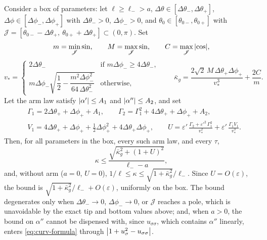 Consider a box of parameters: let \(\ell\ge\ell_->a\), \(\Delta\theta\in[\Delta\theta_-,\Delta\theta_+]\), \(\Delta\phi\in[\Delta\phi_-,\Delta\phi_+]\) with \(\Delta\theta_->0\), \(\Delta\phi_->0\), and \(\theta_0\in[\theta_{0-},\theta_{0+}]\) with \(\mathscr J = [\theta_{0-}-\Delta\theta_+,\ \theta_{0+}+\Delta\theta_+]\subset(0,\pi)\).
Set
\begin{equation}
    m = \min_{\mathscr J}\sin, \qquad M = \max_{\mathscr J}\sin, \qquad C = \max_{\mathscr J}\abs{\cos},
\end{equation}
\begin{equation}
    v_* = \begin{cases}
        2\Delta\theta_- & \text{if } m\Delta\phi_-\ge4\Delta\theta_-, \\[2pt]
        m\Delta\phi_-\sqrt{\dfrac12 - \dfrac{m^2\Delta\phi_-^2}{64\,\Delta\theta_-^2}} & \text{otherwise,}
    \end{cases}
    \qquad
    \bar\kappa_g = \frac{2\sqrt2\,M\,\Delta\theta_+\Delta\phi_+}{v_*^3} + \frac{2C}{m}.
\end{equation}
Let the arm law satisfy \(\abs{\alpha'}\le A_1\) and \(\abs{\alpha''}\le A_2\), and set
\begin{equation}
\begin{split}
    &\Gamma_1 = 2\Delta\theta_+ + \Delta\phi_+ + A_1, \qquad \Gamma_2 = \Gamma_1^2 + 4\Delta\theta_+ + \Delta\phi_+ + A_2, \\
    &V_1 = 4\Delta\theta_+ + \Delta\phi_+ + \tfrac12\Delta\phi_+^2 + 4\Delta\theta_+\Delta\phi_+, \qquad
    U = \varepsilon'\,\frac{\Gamma_2 + \varepsilon'^2\,\Gamma_1^2}{v_*^2} + \varepsilon'\,\frac{\Gamma_1V_1}{v_*^3}.
\end{split}
\end{equation}
Then, for all parameters in the box, every such arm law, and every \(\tau\),
\begin{equation} \label{eq:curv-bound}
    \kappa \le \frac{\sqrt{\bar\kappa_g^2 + (1+U)^2}}{\ell_--a},
\end{equation}
and, without arm (\(a=0\), \(U=0\)), \(1/\ell\le\kappa\le\sqrt{1+\bar\kappa_g^2}/\ell_-\).
Since \(U = O(\varepsilon)\), the bound is \(\sqrt{1+\bar\kappa_g^2}/\ell_- + O(\varepsilon)\), uniformly on the box.
The bound degenerates only when \(\Delta\theta_-\to0\), \(\Delta\phi_-\to0\), or \(\mathscr J\) reaches a pole, which is unavoidable by the exact tip and bottom values above; and, when \(a>0\), the bound on \(\alpha''\) cannot be dispensed with, since \(u_{\sigma\sigma}\), which contains \(\alpha''\) linearly, enters \eqref{eq:curv-formula} through \(\abs{1+u_\sigma^2-u_{\sigma\sigma}}\).
